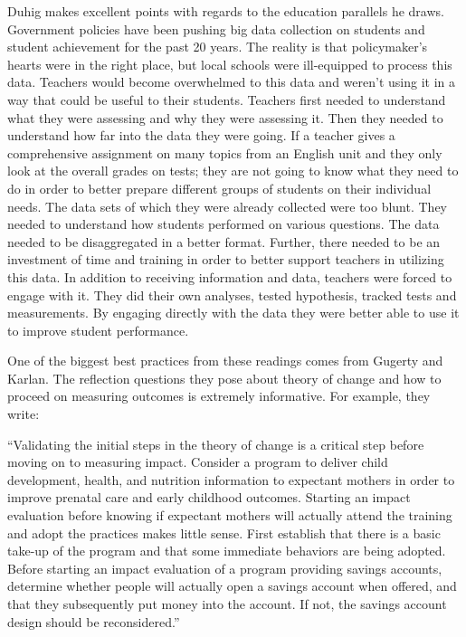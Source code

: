 \documentclass[]{book}
\begin{document}
Duhig makes excellent points with regards to the education parallels he draws. Government policies have been pushing big data collection on students and student achievement for the past 20 years. The reality is that policymaker's hearts were in the right place, but local schools were ill-equipped to process this data. Teachers would become overwhelmed to this data and weren't using it in a way that could be useful to their students. Teachers first needed to understand what they were assessing and why they were assessing it. Then they needed to understand how far into the data they were going. If a teacher gives a comprehensive assignment on many topics from an English unit and they only look at the overall grades on tests; they are not going to know what they need to do in order to better prepare different groups of students on their individual needs. The data sets of which they were already collected were too blunt. They needed to understand how students performed on various questions. The data needed to be disaggregated in a better format. Further, there needed to be an investment of time and training in order to better support teachers in utilizing this data. In addition to receiving information and data, teachers were forced to engage with it. They did their own analyses, tested hypothesis, tracked tests and measurements. By engaging directly with the data they were better able to use it to improve student performance.

One of the biggest best practices from these readings comes from Gugerty and Karlan. The reflection questions they pose about theory of change and how to proceed on measuring outcomes is extremely informative. For example, they write:

``Validating the initial steps in the theory of change is a critical step before moving on to measuring impact. Consider a program to deliver child development, health, and nutrition information to expectant mothers in order to improve prenatal care and early childhood outcomes. Starting an impact evaluation before knowing if expectant mothers will actually attend the training and adopt the practices makes little sense. First establish that there is a basic take-up of the program and that some immediate behaviors are being adopted. Before starting an impact evaluation of a program providing savings accounts, determine whether people will actually open a savings account when offered, and that they subsequently put money into the account. If not, the savings account design should be reconsidered.''
\end{document}
